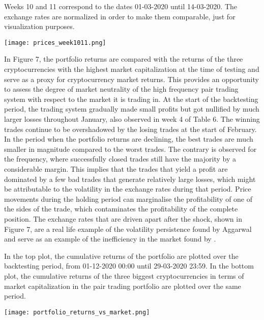 \documentclass[12pt,english,authoryear]{article}
\begin{document}
\begin{center}
\begin{minipage}{\textwidth}
\caption*{\footnotesize Weeks 10 and 11 correspond to the dates 01-03-2020 until 14-03-2020. The exchange rates are normalized in order to make them comparable, just for visualization purposes.}
\texttt{[image: prices\_week1011.png]}
\end{minipage}
\end{center}

In Figure 7, the portfolio returns are compared with the returns of the three cryptocurrencies with the highest market capitalization at the time of testing and serve as a proxy for cryptocurrency market returns. This provides an opportunity to assess the degree of market neutrality of the high frequency pair trading system with respect to the market it is trading in. At the start of the backtesting period, the trading system gradually made small profits but got nullified by much larger losses throughout January, also observed in week 4 of Table 6. The winning trades continue to be overshadowed by the losing trades at the start of February. In the period when the portfolio returns are declining, the best trades are much smaller in magnitude compared to the worst trades. The contrary is observed for the frequency, where successfully closed trades still have the majority by a considerable margin. This implies that the trades that yield a profit are dominated by a few bad trades that generate relatively large losses, which might be attributable to the volatility in the exchange rates during that period. Price movements during the holding period can marginalise the profitability of one of the sides of the trade, which contaminates the profitability of the complete position. The exchange rates that are driven apart after the shock, shown in Figure 7, are a real life example of the volatility persistence found by Aggarwal \citeyear{Aggarwal_2019} and serve as an example of the inefficiency in the market found by \cite{Urquhart_2016}.   

\begin{center}
\begin{minipage}{\textwidth}
\caption*{\footnotesize In the top plot, the cumulative returns of the portfolio are plotted over the backtesting period, from 01-12-2020 00:00 until 29-03-2020 23:59. In the bottom plot, the cumulative returns of the three biggest cryptocurrencies in terms of market capitalization in the pair trading portfolio are plotted over the same period.}
\texttt{[image: portfolio\_returns\_vs\_market.png]}
\end{minipage}
\end{center}
\end{document}
